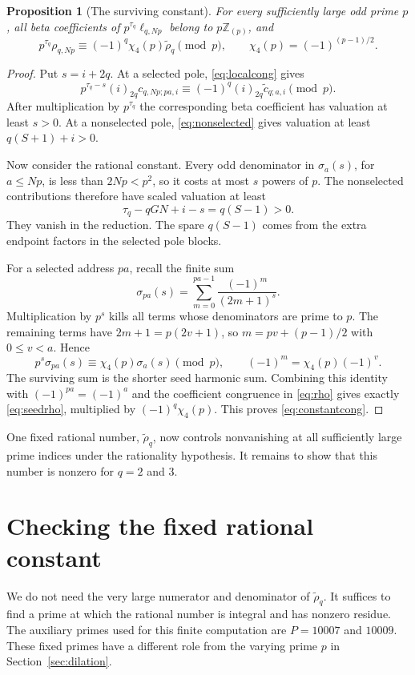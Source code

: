 \documentclass[11pt]{article}
\newtheorem{proposition}[theorem]{Proposition}
\newcommand{\Z}{\mathbb Z}\newcommand{\Q}{\mathbb Q}
\begin{document}
\begin{proposition}[The surviving constant]\label{prop:survive}
For every sufficiently large odd prime $p$, all beta coefficients of
$p^{\tau_q}\ell_{q,Np}$ belong to $p\Z_{(p)}$, and
\begin{equation}\label{eq:constantcong}
 p^{\tau_q}\rho_{q,Np}\equiv(-1)^q\chi_4(p)\widetilde\rho_q\pmod p,
 \qquad \chi_4(p)=(-1)^{(p-1)/2}.
\end{equation}
\end{proposition}
\begin{proof}
Put $s=i+2q$. At a selected pole, \eqref{eq:localcong} gives
\[
 p^{\tau_q-s}(i)_{2q}c_{q,Np;pa,i}
       \equiv(-1)^q(i)_{2q}\widetilde c_{q;a,i}\pmod p.
\]
After multiplication by $p^{\tau_q}$ the corresponding beta coefficient
has valuation at least $s>0$. At a nonselected pole,
\eqref{eq:nonselected} gives valuation at least $q(S+1)+i>0$.

Now consider the rational constant. Every odd denominator in
$\sigma_a(s)$, for $a\le Np$, is less than $2Np<p^2$, so it costs at
most $s$ powers of $p$. The nonselected contributions therefore have
scaled valuation at least
\[
 \tau_q-qGN+i-s=q(S-1)>0.
\]
They vanish in the reduction. The spare $q(S-1)$ comes from the extra
endpoint factors in the selected pole blocks.

For a selected address $pa$, recall the finite sum
\[
 \sigma_{pa}(s)=\sum_{m=0}^{pa-1}\frac{(-1)^m}{(2m+1)^s}.
\]
Multiplication by $p^s$ kills all terms whose denominators are prime to
$p$. The remaining
terms have $2m+1=p(2v+1)$, so
$m=pv+(p-1)/2$ with $0\le v<a$. Hence
\[
 p^s\sigma_{pa}(s)\equiv\chi_4(p)\sigma_a(s)\pmod p,
 \qquad (-1)^m=\chi_4(p)(-1)^v.
\]
The surviving sum is the shorter seed harmonic sum. Combining this
identity with $(-1)^{pa}=(-1)^a$ and the coefficient congruence in
\eqref{eq:rho} gives exactly \eqref{eq:seedrho}, multiplied by
$(-1)^q\chi_4(p)$. This proves \eqref{eq:constantcong}.
\end{proof}

One fixed rational number, $\widetilde\rho_q$, now controls nonvanishing
at all sufficiently large prime indices under the rationality hypothesis.
It remains to show that this number is nonzero for $q=2$ and $3$.

\section{Checking the fixed rational constant}\label{sec:seed}
We do not need the very large numerator and denominator of
$\widetilde\rho_q$. It suffices to find a prime at which the rational
number is integral and has nonzero residue. The auxiliary primes used
for this finite computation are $P=10007$ and $10009$. These fixed primes
have a different role from the varying prime $p$ in Section~\ref{sec:dilation}.
\end{document}
